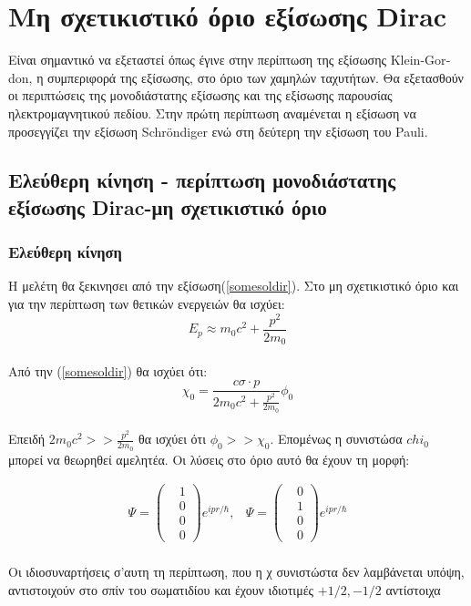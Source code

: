 \section{Μη σχετικιστικό όριο εξίσωσης \textlatin{Dirac}}
Είναι σημαντικό να εξεταστεί όπως έγινε στην περίπτωση της εξίσωσης \textlatin{Klein-Gordon}, η συμπεριφορά της εξίσωσης, στο όριο των χαμηλών ταχυτήτων. Θα εξετασθούν οι περιπτώσεις της μονοδιάστατης εξίσωσης και της εξίσωσης παρουσίας ηλεκτρομαγνητικού πεδίου. Στην πρώτη περίπτωση αναμένεται η εξίσωση να προσεγγίζει την εξίσωση \textlatin{Schr\"ondiger} ενώ στη δεύτερη την εξίσωση του \textlatin{Pauli}. 
\subsection{Ελεύθερη κίνηση - περίπτωση μονοδιάστατης εξίσωσης \textlatin{Dirac}-μη σχετικιστικό όριο}
\subsubsection{Ελεύθερη κίνηση}
Η μελέτη θα ξεκινησει από την εξίσωση(\ref{somesoldir}). Στο μη σχετικιστικό όριο και για την περίπτωση των θετικών ενεργειών θα ισχύει:\\
\[ E_p \approx m_0c^2 + \frac{p^2}{2m_0} \]\\
Από την (\ref{somesoldir}) θα ισχύει ότι: \\
\begin{equation}
  \chi_0 =\frac{c \sigma \cdot p }{2m_0 c^2 + \frac{p^2}{2m_0}}\phi_0
\end{equation} \\
Επειδή $2m_0 c^2 >> \frac{p^2}{2m_0}$ θα ισχύει ότι $\phi_0 >> \chi_0 $. Επομένως η συνιστώσα $chi_0 $ μπορεί να θεωρηθεί αμελητέα. Οι λύσεις στο όριο αυτό θα έχουν τη μορφή: 

\begin{align*} 
  \Psi = 
  \begin{pmatrix}
    &1\\ &0\\ &0\\ &0  
  \end{pmatrix}
  e^{ipr/ \hbar},
  &\Psi = 
  \begin{pmatrix}
    &0\\ &1\\ &0\\ &0  
  \end{pmatrix}
  e^{ipr/ \hbar}
\end{align*}\\
Οι ιδιοσυναρτήσεις σ'αυτη τη περίπτωση, που η χ συνιστώστα δεν λαμβάνεται υπόψη, αντιστοιχούν στο σπίν του σωματιδίου και έχουν ιδιοτιμές $+1/2, -1/2$ αντίστοιχα
